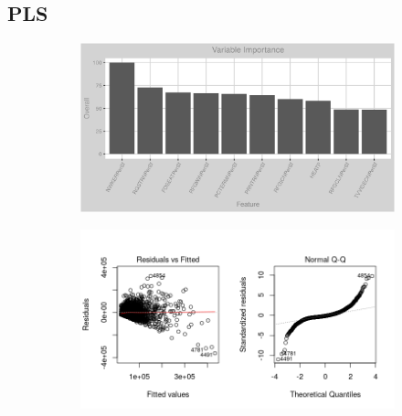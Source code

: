 \subsection{PLS}
\label{appendix:electricity:pls}
\begin{figure}[h]
\centering
\begin{subfigure}{1\textwidth}
\centering
\includegraphics[width=.99\textwidth, height=0.35\textheight]{Images/electricity_psf_pls_vars.png}
\end{subfigure}
\begin{subfigure}{1\textwidth}
\centering
\includegraphics[width=.99\textwidth, height=0.4\textheight]{Images/electricity_psf_pls_res_1.png}
\end{subfigure}
\end{figure}
\FloatBarrier
\newpage
